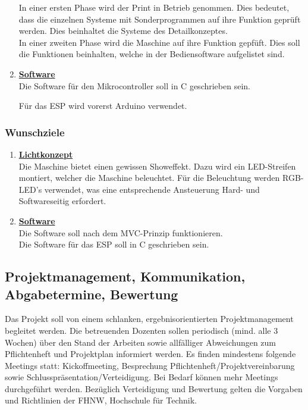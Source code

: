 \begin{enumerate}
In einer ersten Phase wird der Print in Betrieb genommen. Dies bedeutet, dass die einzelnen Systeme mit Sonderprogrammen auf ihre Funktion geprüft werden. Dies beinhaltet die Systeme des Detailkonzeptes.\\

In einer zweiten Phase wird die Maschine auf ihre Funktion gepfüft. Dies soll die Funktionen beinhalten, welche in der Bediensoftware aufgelistet sind.\\
			
			 
\item \underline{\textbf{Software}}\mbox{}\\

Die Software für den Mikrocontroller soll in C geschrieben sein. 
			
Für das ESP wird vorerst Arduino verwendet.
			
\end{enumerate}	
\newpage
\subsubsection{Wunschziele}\label{sec:Wunschziele}

\begin{enumerate}

\item \underline{\textbf{Lichtkonzept}}\mbox{}\\

Die Maschine bietet einen gewissen Showeffekt. Dazu wird ein LED-Streifen montiert, welcher die Maschine beleuchtet. Für die Beleuchtung werden RGB-LED's verwendet, was eine entsprechende Ansteuerung Hard- und Softwareseitig erfordert.\\

\item \underline{\textbf{Software}}\mbox{}\\

Die Software soll nach dem MVC-Prinzip funktionieren.\\

Die Software für das ESP soll in C geschrieben sein.
\end{enumerate}

\newpage

\subsection{Projektmanagement, Kommunikation, Abgabetermine, Bewertung}

Das Projekt soll von einem schlanken, ergebnisorientierten Projektmanagement begleitet werden. 
Die betreuenden Dozenten sollen periodisch (mind. alle 3 Wochen) über den Stand der Arbeiten sowie allfälliger Abweichungen zum Pflichtenheft und Projektplan informiert werden.
Es finden mindestens folgende Meetings statt: Kickoffmeeting, Besprechung Pflichtenheft/Projektvereinbarung sowie Schlusspräsentation/Verteidigung. 
Bei Bedarf können mehr Meetings durchgeführt werden.
Bezüglich Verteidigung und Bewertung gelten die Vorgaben und Richtlinien der FHNW, Hochschule für Technik.

